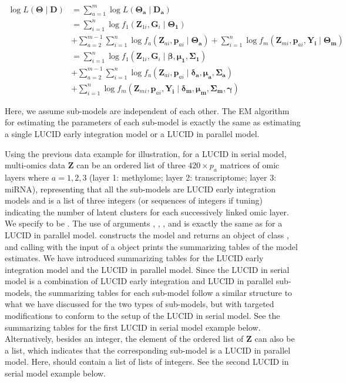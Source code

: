 \begin{equation}
    \begin{aligned}
         \log L(\bm{\Theta}\mid \boldsymbol{D}) & = \sum_{a = 1}^m \log L(\bm{\Theta_a}\mid \bm{D_a}) \\ &
         = \sum_{i = 1}^n \log f_1(\bm{Z}_{1i}, \bm{G}_i \mid \bm{\Theta_1}) \\ &
         + \sum_{a = 2}^{m-1} \sum_{i = 1}^n \log f_a(\bm{Z}_{ai}, \bm{p}_{ai} \mid \bm{\Theta_a}) + \sum_{i = 1}^n \log f_m(\bm{Z}_{mi}, \bm{p}_{ai}, \bm{Y_i} \mid \bm{\Theta_m}) \\ &
         = \sum_{i = 1}^n \log f_1(\bm{Z}_{1i}, \bm{G}_i \mid \bm{\beta}, \bm{\mu_1}, \bm{\Sigma_1}) \\ &
         + \sum_{a = 2}^{m-1} \sum_{i = 1}^n \log f_a(\bm{Z}_{ai}, \bm{p}_{ai} \mid \bm{\delta_a}, \bm{\mu_a}, \bm{\Sigma_a}) \\ &
         + \sum_{i = 1}^n \log f_m(\bm{Z}_{mi}, \bm{p}_{ai}, \bm{Y_i} \mid \bm{\delta_m}, \bm{\mu_m}, \bm{\Sigma_m}, \bm{\gamma})
    \end{aligned}
    \label{eq_27}
\end{equation}

Here, we assume sub-models are independent of each other. The EM algorithm for estimating the parameters of each sub-model is exactly the same as estimating a single LUCID early integration model or a LUCID in parallel model.

Using the previous data example for illustration, for a LUCID in serial model, multi-omics data $\bm Z$ can be an ordered list of three $420 \times p_a$ matrices of omic layers where $a = 1, 2, 3$ (layer 1: methylome; layer 2: transcriptome; layer 3: miRNA), representing that all the sub-models are LUCID early integration models and  is a list of three integers (or sequences of integers if tuning) indicating the number of latent clusters for each successively linked omic layer. We specify  to be . The use of arguments , , , and  is exactly the same as for a LUCID in parallel model.  constructs the model and returns an object of class , and calling  with the input of a  object prints the summarizing tables of the model estimates. We have introduced summarizing tables for the LUCID early integration model and the LUCID in parallel model. Since the LUCID in serial model is a combination of LUCID early integration and LUCID in parallel sub-models, the summarizing tables for each sub-model follow a similar structure to what we have discussed for the two types of sub-models, but with targeted modifications to conform to the setup of the LUCID in serial model. See the summarizing tables for the first LUCID in serial model example below. Alternatively, besides an integer, the element of the ordered list of $\bm Z$ can also be a list, which indicates that the corresponding sub-model is a LUCID in parallel model. Here,  should contain a list of lists of integers. See the second LUCID in serial model example below.

